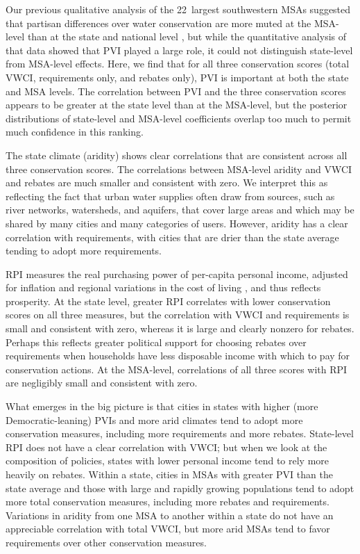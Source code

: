 \documentclass[draft,linenumbers]{agujournal}
\begin{document}
Our previous qualitative analysis of the 22~largest southwestern MSAs suggested
that partisan differences over water conservation are more muted at the
MSA-level than at the state and national level \citep{hess:drought:2016}, but
while the quantitative analysis of that data showed that PVI played a large
role, it could not distinguish state-level from MSA-level effects.
Here, we find that for all three conservation scores (total VWCI, requirements
only, and rebates only), PVI is important at both the state and MSA levels.
The
correlation between
PVI
and the
three conservation scores appears to be
greater at the state level than at the MSA-level, but the posterior
distributions of state-level and MSA-level coefficients overlap too much to
permit much confidence in this ranking.

The state climate (aridity) shows clear
correlations
that are consistent across all three conservation scores.
The
correlations between
MSA-level aridity
and
VWCI and rebates are much
smaller
and consistent with zero.
We interpret this as reflecting the fact that urban water supplies often draw from
sources, such as river networks, watersheds, and aquifers, that cover large areas
and which may be shared by many cities and many categories of users.
However, aridity has a clear
correlation with
requirements, with cities that are
drier than the state average tending to adopt more requirements.

RPI measures the real purchasing power of per-capita personal income,
adjusted for inflation and regional variations in the cost of living
\citep{bea:rpp.methodology:2016}, and thus reflects prosperity.
At the state level, greater RPI correlates with lower conservation scores on
all three measures, but the
correlation with VWCI and requirements
is small and
consistent with zero,
whereas it is large and clearly nonzero for rebates.
Perhaps this reflects greater political support for choosing rebates over
requirements when households have less disposable income with which to pay for
conservation actions.
At the MSA-level,
correlations of all three scores with RPI
are negligibly small and
consistent with zero.

What emerges in the big picture is that cities in states with higher
(more Democratic-leaning) PVIs and more arid climates tend to adopt more
conservation measures, including more requirements and more rebates.
State-level RPI does not have a clear
correlation with
VWCI;
but when we look at the composition of policies, states with lower personal
income tend to rely more heavily on rebates.
Within a state, cities in MSAs with greater PVI than the state average and those
with large and rapidly growing populations tend to adopt more total conservation
measures, including more rebates and requirements.
Variations in aridity from one MSA to another within a state do not have an appreciable
correlation with
total VWCI, but
more arid MSAs tend
to favor requirements over other conservation measures.
\end{document}
